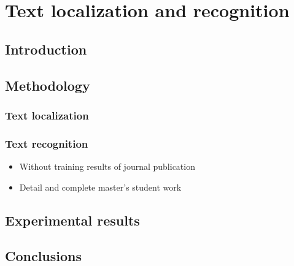 \chapter{Text localization and recognition}
\label{chap:te}
\graphicspath{{./chapters/5-te/figs/}}

\section{Introduction}


\section{Methodology}

\subsection{Text localization} %
\label{sub:te:text_localization}


\subsection{Text recognition} %
\label{sub:te:text_recognition}

\begin{itemize}
	\item Without training results of journal publication
	\item Detail and complete master's student work
\end{itemize}


\section{Experimental results}
\label{sub:te:experimental_resutls}

\section{Conclusions}
\label{sub:te:conclusion}
